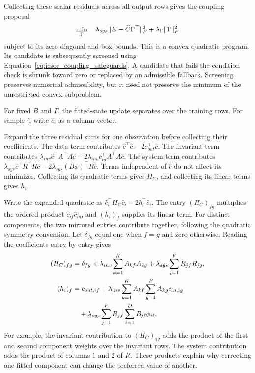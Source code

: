 Collecting these scalar residuals across all output rows gives the coupling proposal
\begin{equation}
\equationname{Regularized least-squares update for component coupling}
\label{eq:icsor_coupling_update}
\min_{\Gamma}\quad
\lambda_{sys}\|E-\widehat C\Gamma^\top\|_F^2+
\lambda_{\Gamma}\|\Gamma\|_F^2
\end{equation}
subject to its zero diagonal and box bounds. This is a convex quadratic program. Its candidate is subsequently screened using Equation~\eqref{eq:icsor_coupling_safeguards}. A candidate that fails the condition check is shrunk toward zero or replaced by an admissible fallback. Screening preserves numerical admissibility, but it need not preserve the minimum of the unrestricted convex subproblem.

For fixed \(B\) and \(\Gamma\), the fitted-state update separates over the training rows. For sample \(i\), write \(\widehat c_i\) as a column vector.

Expand the three residual sums for one observation before collecting their coefficients. The data term contributes \(\widehat c^\top\widehat c-2c_{out}^\top\widehat c\). The invariant term contributes \(\lambda_{inv}\widehat c^\top A^\top A\widehat c-2\lambda_{inv}c_{in}^\top A^\top A\widehat c\). The system term contributes \(\lambda_{sys}\widehat c^\top R^\top R\widehat c-2\lambda_{sys}(B\phi)^\top R\widehat c\). Terms independent of \(\widehat c\) do not affect its minimizer. Collecting its quadratic terms gives \(H_C\), and collecting its linear terms gives \(h_i\).

Write the expanded quadratic as \(\widehat c_i^\top H_C\widehat c_i-2h_i^\top\widehat c_i\). The entry \((H_C)_{fg}\) multiplies the ordered product \(\widehat c_{if}\widehat c_{ig}\), and \((h_i)_f\) supplies its linear term. For distinct components, the two mirrored entries contribute together, following the quadratic symmetry convention. Let \(\delta_{fg}\) equal one when \(f=g\) and zero otherwise. Reading the coefficients entry by entry gives
\begin{equation}
\equationname{Scalar entries of the fitted-state Hessian and forcing vector}
\label{eq:icsor_state_scalar_coefficients}
\begin{aligned}
(H_C)_{fg}&=\delta_{fg}+\lambda_{inv}\sum_{k=1}^{K}A_{kf}A_{kg}
+\lambda_{sys}\sum_{j=1}^{F}R_{jf}R_{jg},\\
(h_i)_f&=c_{out,if}
+\lambda_{inv}\sum_{k=1}^{K}A_{kf}\sum_{g=1}^{F}A_{kg}c_{in,ig}\\
&\quad+\lambda_{sys}\sum_{j=1}^{F}R_{jf}\sum_{\ell=1}^{D}B_{j\ell}\phi_{i\ell}.
\end{aligned}
\end{equation}
For example, the invariant contribution to \((H_C)_{12}\) adds the product of the first and second component weights over the invariant rows. The system contribution adds the product of columns 1 and 2 of \(R\). These products explain why correcting one fitted component can change the preferred value of another.


